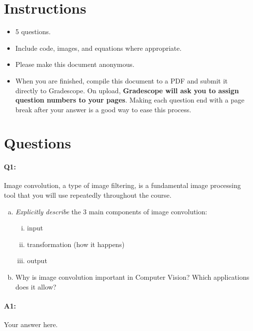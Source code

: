 \maketitle
\vspace{-3cm}
\thispagestyle{fancy}

\section*{Instructions}
\begin{itemize}
  \item 5 questions.
  \item Include code, images, and equations where appropriate.
  \item Please make this document anonymous.
  \item When you are finished, compile this document to a PDF and submit it directly to Gradescope. On upload, \textbf{Gradescope will ask you to assign question numbers to your pages}. Making each question end with a page break after your answer is a good way to ease this process.
\end{itemize}

\section*{Questions}

\paragraph{Q1:} Image convolution, a type of image filtering, is a fundamental image processing tool that you will use repeatedly throughout the course.

\begin{enumerate}[(a)]
\item \emph{Explicitly describe} the 3 main components of image convolution:
\begin{enumerate}[(i)]
    \item input
    \item transformation (how it happens)
    \item output
\end{enumerate}
\item Why is image convolution important in Computer Vision? Which applications does it allow?
\end{enumerate}


\paragraph{A1:} Your answer here.

